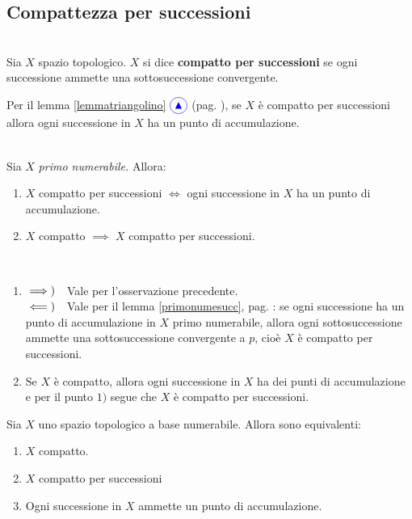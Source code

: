 \subsection{Compattezza per successioni}
\begin{define}~{}\\
Sia $X$ spazio topologico. $X$ si dice \textbf{compatto per successioni} se ogni successione ammette una sottosuccessione convergente.
\end{define}
\begin{observe}
Per il lemma \ref{lemmatriangolino} $\textcolor{blue}{\circled{{\large \blacktriangle}}}$ (pag. \pageref{lemmatriangolino}), se $X$ è compatto per successioni allora ogni successione in $X$ ha un punto di accumulazione.
\end{observe}
\begin{lemming}~{}\\
	Sia $X$ \textit{primo numerabile.} Allora:
\begin{enumerate}
	\item $X$ compatto per successioni $\iff $ ogni successione in $X$ ha un punto di accumulazione.
	\item $X$ compatto $\implies$ $X$ compatto per successioni.
\end{enumerate}
\vspace{-3mm}
\end{lemming}
\begin{demonstration}~{}
\begin{enumerate}[label=\Roman*]
\item $\implies)\quad$Vale per l'osservazione precedente.\\
$\impliedby)\quad$Vale per il lemma \ref{primonumesucc}, pag. \pageref{primonumesucc}: se ogni successione ha un punto di accumulazione in $X$ primo numerabile, allora ogni sottosuccessione ammette una sottosuccessione convergente a $p$, cioè $X$ è compatto per successioni.
\item Se $X$ è compatto, allora ogni successione in $X$ ha dei punti di accumulazione e per il punto $1)$ segue che $X$ è compatto per successioni.
\end{enumerate}
\vspace{-3mm}
\end{demonstration}
\begin{proposition}
	Sia $X$ uno spazio topologico a base numerabile. Allora sono equivalenti:
	\begin{enumerate}
		\item $X$ compatto.
		\item $X$ compatto per successioni
		\item Ogni successione in $X$ ammette un punto di accumulazione.
	\end{enumerate}
\vspace{-3mm}
\end{proposition}
